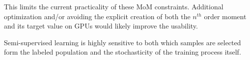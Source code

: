 \documentclass[10pt,twocolumn,letterpaper]{article}
\begin{document}
This limits the current practicality of these MoM constraints. 
Additional optimization and/or avoiding the explicit creation of both the $n^{th}$ order moment and its target value on GPUs would likely improve the usability.

Semi-supervised learning is highly sensitive to both which samples are selected form the labeled population \cite{sohn2020fixmatch} and the stochasticity of the training process itself.

\end{document}
